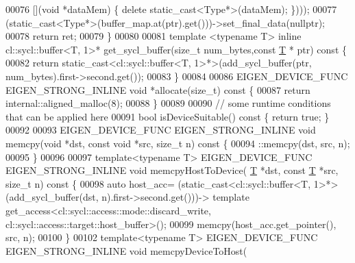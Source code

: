 \begin{DoxyCode}
00076       [](\textcolor{keywordtype}{void} *dataMem) \{ \textcolor{keyword}{delete} \textcolor{keyword}{static\_cast<}Type*\textcolor{keyword}{>}(dataMem); \})));
00077     (\textcolor{keyword}{static\_cast<}Type*\textcolor{keyword}{>}(buffer\_map.at(ptr).get()))->set\_final\_data(\textcolor{keyword}{nullptr});
00078     \textcolor{keywordflow}{return} ret;
00079   \}
00080 
00081   \textcolor{keyword}{template} <\textcolor{keyword}{typename} T> \textcolor{keyword}{inline} cl::sycl::buffer<T, 1>* get\_sycl\_buffer(\textcolor{keywordtype}{size\_t} num\_bytes,\textcolor{keyword}{const} 
      \hyperlink{group___sparse_core___module_class_eigen_1_1_triplet}{T} * ptr)\textcolor{keyword}{ const }\{
00082     \textcolor{keywordflow}{return} \textcolor{keyword}{static\_cast<}cl::sycl::buffer<T, 1>*\textcolor{keyword}{>}(add\_sycl\_buffer(ptr, num\_bytes).first->second.get());
00083   \}
00084 
00086   EIGEN\_DEVICE\_FUNC EIGEN\_STRONG\_INLINE \textcolor{keywordtype}{void} *allocate(\textcolor{keywordtype}{size\_t})\textcolor{keyword}{ const }\{
00087     \textcolor{keywordflow}{return} internal::aligned\_malloc(8);
00088   \}
00089 
00090   \textcolor{comment}{// some runtime conditions that can be applied here}
00091   \textcolor{keywordtype}{bool} isDeviceSuitable()\textcolor{keyword}{ const }\{ \textcolor{keywordflow}{return} \textcolor{keyword}{true}; \}
00092 
00093   EIGEN\_DEVICE\_FUNC EIGEN\_STRONG\_INLINE \textcolor{keywordtype}{void} memcpy(\textcolor{keywordtype}{void} *dst, \textcolor{keyword}{const} \textcolor{keywordtype}{void} *src, \textcolor{keywordtype}{size\_t} n)\textcolor{keyword}{ const }\{
00094     ::memcpy(dst, src, n);
00095   \}
00096 
00097   \textcolor{keyword}{template}<\textcolor{keyword}{typename} T> EIGEN\_DEVICE\_FUNC EIGEN\_STRONG\_INLINE \textcolor{keywordtype}{void} memcpyHostToDevice(
      \hyperlink{group___sparse_core___module_class_eigen_1_1_triplet}{T} *dst, \textcolor{keyword}{const} \hyperlink{group___sparse_core___module_class_eigen_1_1_triplet}{T} *src, \textcolor{keywordtype}{size\_t} n)\textcolor{keyword}{ const }\{
00098     \textcolor{keyword}{auto} host\_acc= (\textcolor{keyword}{static\_cast<}cl::sycl::buffer<T, 1>*\textcolor{keyword}{>}(add\_sycl\_buffer(dst, n).first->second.get()))-> \textcolor{keyword}{
      template} get\_access<cl::sycl::access::mode::discard\_write, cl::sycl::access::target::host\_buffer>();
00099     memcpy(host\_acc.get\_pointer(), src, n);
00100   \}
00102   \textcolor{keyword}{template}<\textcolor{keyword}{typename} T> EIGEN\_DEVICE\_FUNC EIGEN\_STRONG\_INLINE \textcolor{keywordtype}{void} memcpyDeviceToHost(

\end{DoxyCode}
